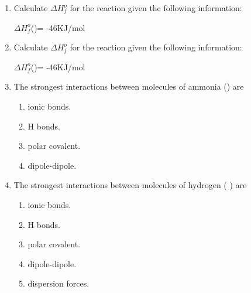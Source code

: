 \documentclass[main.tex]{subfiles}
\begin{document}
\begin{fullwidth}
\begin{multicols*}{2}
\begin{enumerate}
\item Calculate $\Delta H^o_f$ for the reaction given the following information:
	\begin{center}\end{center}	
$\Delta H^o_f$()= -46KJ/mol
\begin{enumerate}[label=(\alph*)]\vspace{-0.5cm}
\end{enumerate}\vspace{-0.5cm}


\item Calculate $\Delta H^o_f$ for the reaction given the following information:
	\begin{center}\end{center}	
$\Delta H^o_f$()= -46KJ/mol
\begin{enumerate}[label=(\alph*)]\vspace{-0.5cm}
\end{enumerate}\vspace{-0.5cm}

\item The strongest interactions between molecules of ammonia () are
\begin{enumerate}[label=(\alph*)]
\item  ionic bonds.
\item  H bonds.
\item  polar covalent.
\item  dipole-dipole.
\end{enumerate} 

		
\item The strongest interactions between molecules of hydrogen ( ) are
\begin{enumerate}[label=(\alph*)]
\item  ionic bonds.
\item  H bonds.
\item  polar covalent.
\item  dipole-dipole.
\item  dispersion forces.
\end{enumerate} 
		

\end{enumerate}
\end{multicols*}
\end{fullwidth}
\end{document}
